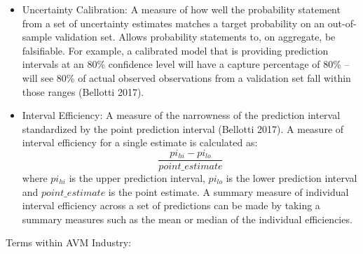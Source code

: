 \documentclass[colTwo]{anon}
\theoremstyle{definition}
\begin{document}
\begin{itemize}
\item Uncertainty Calibration: A measure of how well the probability statement from a set of uncertainty estimates matches a target probability on an out-of-sample validation set. Allows probability statements to, on aggregate, be falsifiable. For example, a calibrated model that is providing prediction intervals at an 80\% confidence level will have a capture percentage of 80\% -- will see 80\% of actual observed observations from a validation set fall within those ranges (Bellotti 2017).
\item Interval Efficiency: A measure of the narrowness of the prediction interval standardized by the point prediction interval (Bellotti 2017). A measure of interval efficiency for a single estimate is calculated as:
\[\frac{pi_{hi} - pi_{lo}}{point\_estimate}\] where \(pi_{hi}\) is the upper prediction interval, \(pi_{lo}\) is the lower prediction interval and \(point\_estimate\) is the point estimate. A summary measure of individual interval efficiency across a set of predictions can be made by taking a summary measures such as the mean or median of the individual efficiencies.

\end{itemize}

Terms within AVM Industry:
\end{document}
